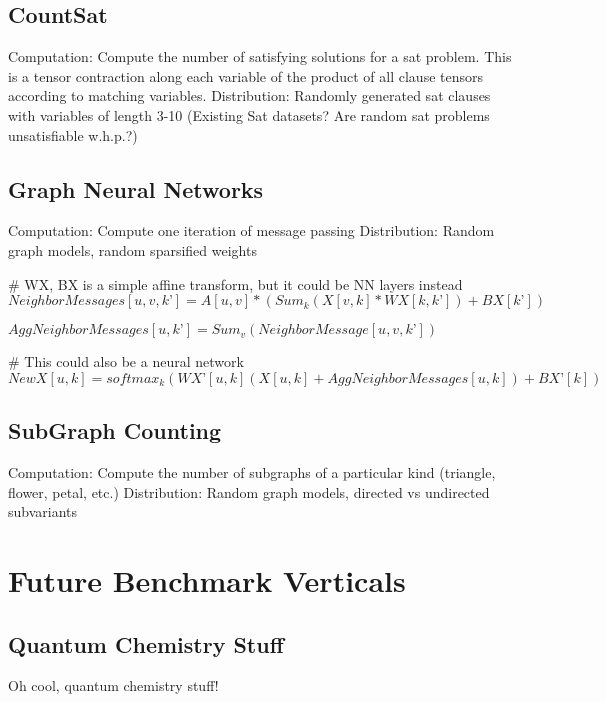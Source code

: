 \documentclass{article}
\begin{document}
\subsection{CountSat}
	Computation: Compute the number of satisfying solutions for a sat problem. This is a tensor contraction along each variable of the product of all clause tensors according to matching variables.
	Distribution: Randomly generated sat clauses with variables of length 3-10 (Existing Sat datasets? Are random sat problems unsatisfiable w.h.p.?)

\subsection{Graph Neural Networks}
	Computation: Compute one iteration of message passing
	Distribution: Random graph models, random sparsified weights

# WX, BX is a simple affine transform, but it could be NN layers instead
$NeighborMessages[u, v, k’] = A[u, v]*(Sum_k(X[v, k]*WX[k, k’]) +BX[k’])  $

$AggNeighborMessages[u, k’] = Sum_v(NeighborMessage[u, v, k’])$

# This could also be a neural network
$NewX[u, k] = softmax_k(WX’[u,k](X[u, k] +AggNeighborMessages[u,k]) + BX’[k]) $

\subsection{SubGraph Counting}
	Computation: Compute the number of subgraphs of a particular kind (triangle, flower, petal, etc.)
	Distribution: Random graph models, directed vs undirected subvariants

\section{Future Benchmark Verticals}

\subsection{Quantum Chemistry Stuff}
Oh cool, quantum chemistry stuff!



\end{document}
